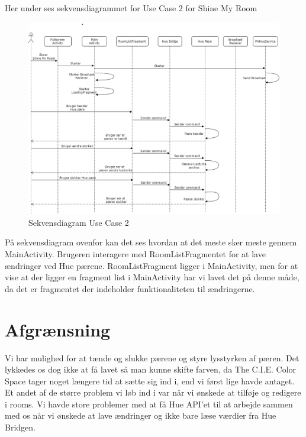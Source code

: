 Her under ses sekvensdiagrammet for Use Case 2 for Shine My Room
\begin{figure}[H]
	\centering
	\includegraphics[width=1\linewidth, height=0.8\linewidth]{Design/SekvensDiagramUC2}
	\caption{Sekvensdiagram Use Case 2}
	\label{fig:SekvensdiagramUC2}
\end{figure}
På sekvensdiagram ovenfor kan det ses hvordan at det meste sker meste gennem MainActivity. Brugeren interagere med RoomListFragmentet for at lave ændringer ved Hue pærene. RoomListFragment ligger i MainActivity, men for at vise at der ligger en fragment list i MainActivity har vi lavet det på denne måde, da det er fragmentet der indeholder funktionaliteten til ændringerne. \\

\section{Afgrænsning}
Vi har mulighed for at tænde og slukke pærene og styre lysstyrken af pæren. Det lykkedes os dog ikke at få lavet så man kunne skifte farven, da The C.I.E. Color Space tager noget længere tid at sætte sig ind i, end vi først lige havde antaget.\\
Et andet af de større problem vi løb ind i var når vi ønskede at tilføje og redigere i rooms. Vi havde store problemer med at få Hue API'et til at arbejde sammen med os når vi ønskede at lave ændringer og ikke bare læse værdier fra Hue Bridgen.
